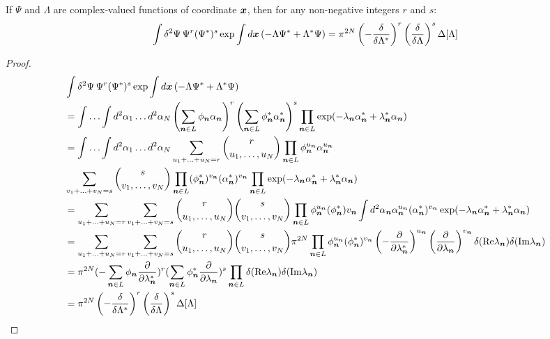 \begin{lemma}
\label{lmm:formalism:func-calculus:fourier-of-moments}
If $\Psi$ and $\Lambda$ are complex-valued functions of coordinate $\boldsymbol{x}$,
then for any non-negative integers $r$ and $s$:
\[
	\int \delta^2\Psi\, \Psi^r (\Psi^*)^s \exp
		\int d\boldsymbol{x} \left( -\Lambda \Psi^* + \Lambda^* \Psi \right)
	= \pi^{2N}
		\left( -\frac{\delta}{\delta \Lambda^*} \right)^r
		\left( \frac{\delta}{\delta \Lambda} \right)^s
		\Delta[\Lambda]
\]
\end{lemma}
\begin{proof}
\begin{equation*}
\begin{split}
	& \int \delta^2\Psi\, \Psi^r (\Psi^*)^s \exp
		\int d\boldsymbol{x} \left( -\Lambda \Psi^* + \Lambda^* \Psi \right) \\
	& = \int \ldots \int d^2\alpha_1 \ldots d^2\alpha_N
		\left( \sum_{\boldsymbol{n} \in L} \phi_{\boldsymbol{n}} \alpha_{\boldsymbol{n}} \right)^r
		\left( \sum_{\boldsymbol{n} \in L} \phi^*_{\boldsymbol{n}} \alpha_{\boldsymbol{n}}^* \right)^s
		\prod_{\boldsymbol{n} \in L} \exp(-\lambda_{\boldsymbol{n}} \alpha_{\boldsymbol{n}}^* + \lambda_{\boldsymbol{n}}^* \alpha_{\boldsymbol{n}}) \\
	& = \int \ldots \int d^2\alpha_1 \ldots d^2\alpha_N
		\sum_{u_1 + \ldots + u_N = r} \binom{r}{u_1, \ldots, u_N}
			\prod_{\boldsymbol{n} \in L} \phi_{\boldsymbol{n}}^{u_{\boldsymbol{n}}} \alpha_{\boldsymbol{n}}^{u_{\boldsymbol{n}}} \\
	&	\sum_{v_1 + \ldots + v_N = s} \binom{s}{v_1, \ldots, v_N}
			\prod_{\boldsymbol{n} \in L} (\phi_{\boldsymbol{n}}^*)^{v_{\boldsymbol{n}}} (\alpha_{\boldsymbol{n}}^*)^{v_{\boldsymbol{n}}}
		\prod_{\boldsymbol{n} \in L} \exp(-\lambda_{\boldsymbol{n}} \alpha_{\boldsymbol{n}}^* + \lambda_{\boldsymbol{n}}^* \alpha_{\boldsymbol{n}}) \\
	& = \sum_{u_1 + \ldots + u_N = r}
		\sum_{v_1 + \ldots + v_N = s}
		\binom{r}{u_1, \ldots, u_N}
		\binom{s}{v_1, \ldots, v_N}
		\prod_{\boldsymbol{n} \in L}
			\phi_{\boldsymbol{n}}^{u_{\boldsymbol{n}}} (\phi_{\boldsymbol{n}}^*){v_{\boldsymbol{n}}}
			\int d^2\alpha_{\boldsymbol{n}}
				\alpha_{\boldsymbol{n}}^{u_{\boldsymbol{n}}}
				(\alpha_{\boldsymbol{n}}^*)^{v_{\boldsymbol{n}}}
				\exp(-\lambda_{\boldsymbol{n}} \alpha_{\boldsymbol{n}}^* + \lambda_{\boldsymbol{n}}^* \alpha_{\boldsymbol{n}}) \\
	& = \sum_{u_1 + \ldots + u_N = r}
		\sum_{v_1 + \ldots + v_N = s}
		\binom{r}{u_1, \ldots, u_N}
		\binom{s}{v_1, \ldots, v_N}
		\pi^{2N}
		\prod_{\boldsymbol{n} \in L}
			\phi_{\boldsymbol{n}}^{u_{\boldsymbol{n}}} (\phi_{\boldsymbol{n}}^*)^{v_{\boldsymbol{n}}}
			\left( -\frac{\partial}{\partial \lambda_{\boldsymbol{n}}^*} \right)^{u_{\boldsymbol{n}}}
			\left( \frac{\partial}{\partial \lambda_{\boldsymbol{n}}} \right)^{v_{\boldsymbol{n}}}
			\delta(\mathrm{Re} \lambda_{\boldsymbol{n}}) \delta(\mathrm{Im} \lambda_{\boldsymbol{n}}) \\
	& = \pi^{2N}
		(-\sum_{\boldsymbol{n} \in L} \phi_{\boldsymbol{n}} \frac{\partial}{\partial \lambda_{\boldsymbol{n}}^*})^r
		(\sum_{\boldsymbol{n} \in L} \phi_{\boldsymbol{n}}^* \frac{\partial}{\partial \lambda_{\boldsymbol{n}}})^s
		\prod_{\boldsymbol{n} \in L} \delta(\mathrm{Re} \lambda_{\boldsymbol{n}}) \delta(\mathrm{Im} \lambda_{\boldsymbol{n}}) \\
	& = \pi^{2N}
		\left( -\frac{\delta}{\delta \Lambda^*} \right)^r
		\left( \frac{\delta}{\delta \Lambda} \right)^s
		\Delta[\Lambda]
	\qedhere
\end{split}
\end{equation*}
\end{proof}


